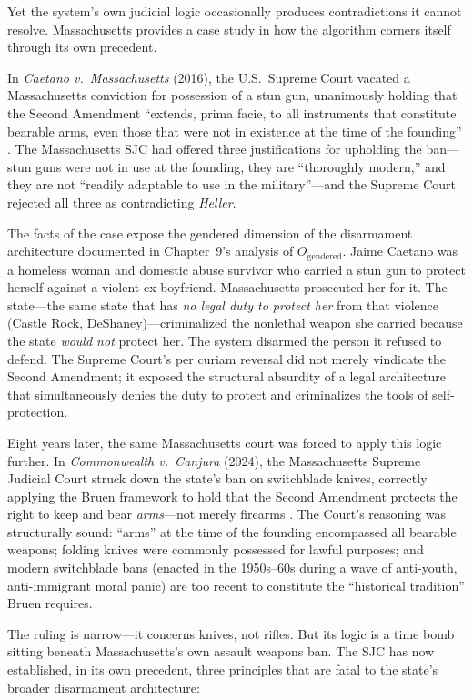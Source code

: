 \documentclass[12pt,openany]{book}
\begin{document}
Yet the system's own judicial logic occasionally produces contradictions it cannot resolve. Massachusetts provides a case study in how the algorithm corners itself through its own precedent.

In \textit{Caetano v.\ Massachusetts} (2016), the U.S.\ Supreme Court vacated a Massachusetts conviction for possession of a stun gun, unanimously holding that the Second Amendment ``extends, prima facie, to all instruments that constitute bearable arms, even those that were not in existence at the time of the founding'' \cite{caetano}. The Massachusetts SJC had offered three justifications for upholding the ban---stun guns were not in use at the founding, they are ``thoroughly modern,'' and they are not ``readily adaptable to use in the military''---and the Supreme Court rejected all three as contradicting \textit{Heller}.

The facts of the case expose the gendered dimension of the disarmament architecture documented in Chapter~9's analysis of $O_{\text{gendered}}$. Jaime Caetano was a homeless woman and domestic abuse survivor who carried a stun gun to protect herself against a violent ex-boyfriend. Massachusetts prosecuted her for it. The state---the same state that has \textit{no legal duty to protect her} from that violence (Castle Rock, DeShaney)---criminalized the nonlethal weapon she carried because the state \textit{would not} protect her. The system disarmed the person it refused to defend. The Supreme Court's per curiam reversal did not merely vindicate the Second Amendment; it exposed the structural absurdity of a legal architecture that simultaneously denies the duty to protect and criminalizes the tools of self-protection.

Eight years later, the same Massachusetts court was forced to apply this logic further. In \textit{Commonwealth v.\ Canjura} (2024), the Massachusetts Supreme Judicial Court struck down the state's ban on switchblade knives, correctly applying the Bruen framework to hold that the Second Amendment protects the right to keep and bear \textit{arms}---not merely firearms \cite{canjura}. The Court's reasoning was structurally sound: ``arms'' at the time of the founding encompassed all bearable weapons; folding knives were commonly possessed for lawful purposes; and modern switchblade bans (enacted in the 1950s--60s during a wave of anti-youth, anti-immigrant moral panic) are too recent to constitute the ``historical tradition'' Bruen requires.

The ruling is narrow---it concerns knives, not rifles. But its logic is a time bomb sitting beneath Massachusetts's own assault weapons ban. The SJC has now established, in its own precedent, three principles that are fatal to the state's broader disarmament architecture:
\end{document}
